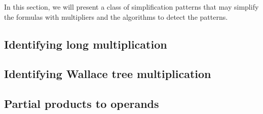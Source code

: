 In this section, we will present a class of simplification patterns that
may simplify the formulas with multipliers 
and the algorithms to detect the patterns.


\subsection{Identifying long multiplication}

\subsection{Identifying Wallace tree multiplication}

\subsection{Partial products to operands}










